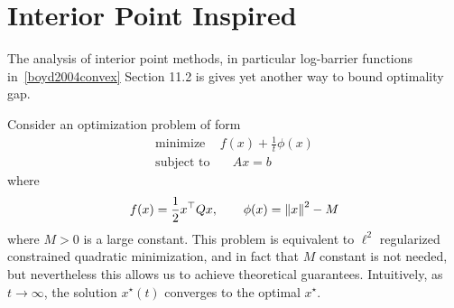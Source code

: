 \documentclass[12pt]{article}
\begin{document}
\section{Interior Point Inspired}

The analysis of interior point methods, in particular log-barrier functions
in~\ref{boyd2004convex} Section 11.2
is gives yet another way to bound optimality gap.

Consider an optimization problem of form
\begin{align}
  \text{minimize}& f(x) + \frac{1}{t} \phi(x) \label{eqn:fake-barrier} \\
  \text{subject to}&\quad Ax = b \nonumber
\end{align}
where
\begin{align*}
  f(x) = \frac{1}{2} x^\top Q x,
    \qquad \phi(x) = {\left\lVert x\right\rVert}^2 - M
\end{align*}
where \(M > 0\) is a large constant.
This problem is equivalent to \(\ell^2\) regularized constrained
quadratic minimization,
and in fact that \(M\) constant is not needed, but nevertheless
this allows us to achieve theoretical guarantees.
Intuitively, as \(t \to \infty\),
the solution \(x^\star (t)\) converges to the optimal \(x^\star\).
\end{document}
